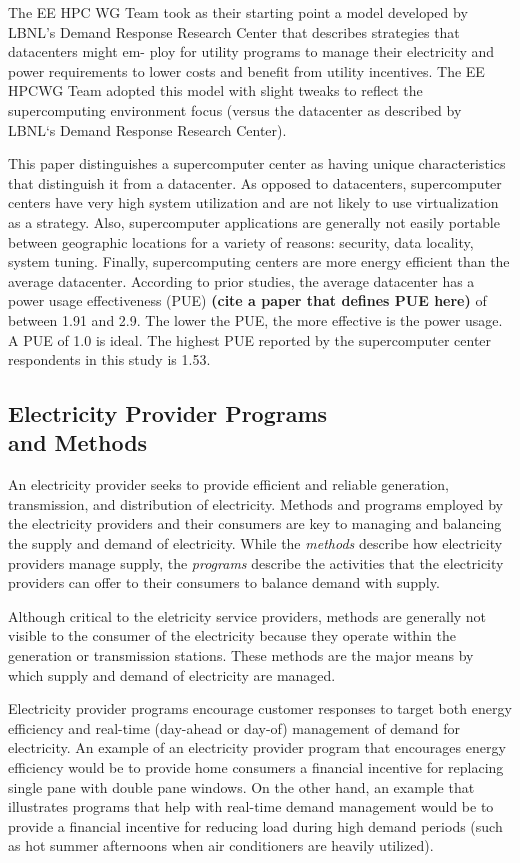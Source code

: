The EE HPC WG Team took as their starting point a
model developed by LBNL's Demand Response Research
Center that describes strategies that datacenters might em-
ploy for utility programs to manage their electricity and
power requirements to lower costs and benefit from utility
incentives. The EE HPCWG Team adopted this model with
slight tweaks to reflect the supercomputing environment
focus (versus the datacenter as described by LBNL`s Demand
Response Research Center).

This paper distinguishes a supercomputer center as
having unique characteristics that distinguish it from 
a datacenter. As opposed to datacenters, supercomputer
centers have very high system utilization and are not likely
to use virtualization as a strategy. Also, supercomputer
applications are generally not easily portable between
geographic locations for a variety of reasons: security, data 
locality, system tuning.  Finally, supercomputing centers are 
more energy efficient than the average datacenter.
According to prior studies,
the average datacenter has a power usage effectiveness (PUE)
\textbf{(cite a paper that defines PUE here)} of between 1.91 and 2.9.
The lower the PUE, the more effective is the power usage. A PUE of 1.0 is ideal.
The highest PUE reported by the
supercomputer center respondents in this study is 1.53.

\subsection{Electricity Provider Programs\\
and Methods}
\label{sub:EPP}
An electricity provider seeks to provide efficient and reliable generation, transmission, and 
distribution of electricity. Methods and programs employed by the electricity providers and their consumers 
are key to managing and balancing the supply and demand of electricity. While the \textit{methods} 
describe how 
electricity providers manage supply, the \textit{programs} describe the activities that 
the electricity providers 
can offer to their consumers to balance demand with supply.

Although critical to the eletricity service providers, methods 
are generally not visible to the consumer of the electricity because they
operate within the generation  or transmission stations.
These methods are the major means by which supply and demand of electricity are managed.

Electricity provider programs encourage customer responses to target both energy efficiency and real-time
(day-ahead or day-of) management of demand for electricity. An example of an electricity provider program 
that encourages energy efficiency would be to provide home consumers a financial incentive for replacing 
single pane with double pane windows.  On the other hand, an example that illustrates programs that help 
with real-time demand management would be to provide a financial incentive for reducing load 
during high demand periods 
(such as hot summer afternoons when air conditioners are heavily utilized). 

